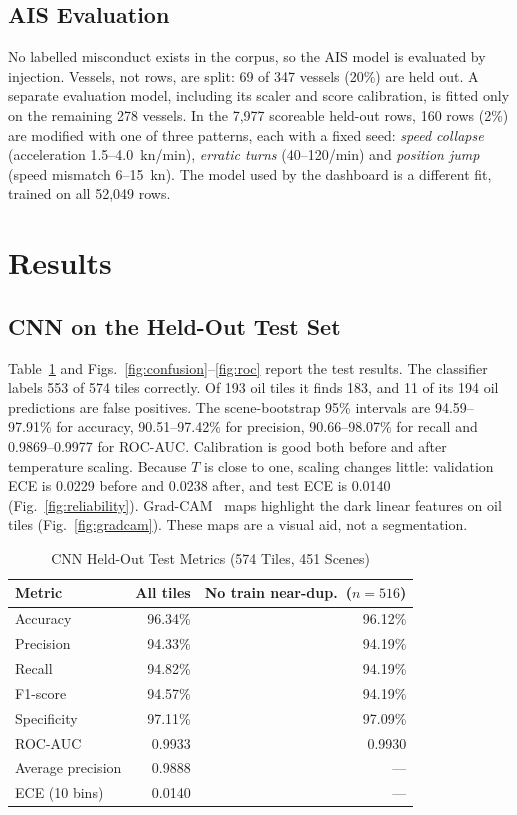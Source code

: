 \documentclass[conference]{IEEEtran}
\begin{document}
\subsection{AIS Evaluation}
No labelled misconduct exists in the corpus, so the AIS model is evaluated by injection.
Vessels, not rows, are split: 69 of 347 vessels (20\%) are held out. A separate
evaluation model, including its scaler and score calibration, is fitted only on the
remaining 278 vessels. In the 7,977 scoreable held-out rows, 160 rows (2\%) are modified
with one of three patterns, each with a fixed seed: \emph{speed collapse} (acceleration
1.5--4.0~kn/min), \emph{erratic turns} (40--120\textdegree/min) and \emph{position jump}
(speed mismatch 6--15~kn). The model used by the dashboard is a different fit, trained on
all 52,049 rows.

\section{Results}

\subsection{CNN on the Held-Out Test Set}
Table~\ref{tab:cnn} and Figs.~\ref{fig:confusion}--\ref{fig:roc} report the test results.
The classifier labels 553 of 574 tiles correctly. Of 193 oil tiles it finds 183, and 11 of
its 194 oil predictions are false positives. The scene-bootstrap 95\% intervals are
94.59--97.91\% for accuracy, 90.51--97.42\% for precision, 90.66--98.07\% for recall and
0.9869--0.9977 for ROC-AUC. Calibration is good both before and after temperature scaling.
Because $T$ is close to one, scaling changes little: validation ECE is 0.0229 before and
0.0238 after, and test ECE is 0.0140 (Fig.~\ref{fig:reliability}). Grad-CAM~\cite{selvaraju2017}
maps highlight the dark linear features on oil tiles (Fig.~\ref{fig:gradcam}). These maps
are a visual aid, not a segmentation.

\begin{table}[t]
\caption{CNN Held-Out Test Metrics (574 Tiles, 451 Scenes)}
\label{tab:cnn}
\centering
\footnotesize
\begin{tabular}{@{}lrr@{}}
\toprule
Metric & All tiles & No train near-dup.\ ($n{=}516$) \\
\midrule
Accuracy & 96.34\% & 96.12\% \\
Precision & 94.33\% & 94.19\% \\
Recall & 94.82\% & 94.19\% \\
F1-score & 94.57\% & 94.19\% \\
Specificity & 97.11\% & 97.09\% \\
ROC-AUC & 0.9933 & 0.9930 \\
Average precision & 0.9888 & --- \\
ECE (10 bins) & 0.0140 & --- \\
\bottomrule
\end{tabular}
\end{table}
\end{document}

